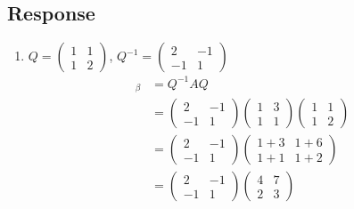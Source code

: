 \documentclass[13pt]{article}
\begin{document}
\subsection*{Response}
\begin{enumerate}[label=(\alph*),leftmargin=*]
\item $Q =
  \begin{pmatrix}
    1 & 1 \\
    1 & 2
  \end{pmatrix}
  $, $Q^{-1} =
  \begin{pmatrix}
    2 & -1 \\
    -1 & 1
  \end{pmatrix}
  $
  \begin{align*}
    [L_A]_\beta &= Q^{-1}AQ \\
                &=
                  \begin{pmatrix}
                    2 & -1 \\
                    -1 & 1
                  \end{pmatrix}
                  \begin{pmatrix}
                    1 & 3 \\
                    1 & 1
                  \end{pmatrix}
                  \begin{pmatrix}
                    1 & 1 \\
                    1 & 2
                  \end{pmatrix} \\
                &=
                  \begin{pmatrix}
                    2 & -1 \\
                    -1 & 1
                  \end{pmatrix}
                  \begin{pmatrix}
                    1 + 3 & 1 + 6 \\
                    1 + 1 & 1 + 2
                  \end{pmatrix} \\
                &=
                  \begin{pmatrix}
                    2 & -1 \\
                    -1 & 1
                  \end{pmatrix}
                  \begin{pmatrix}
                    4 & 7 \\
                    2 & 3

\end{pmatrix}
\end{align*}
\end{enumerate}
\end{document}
